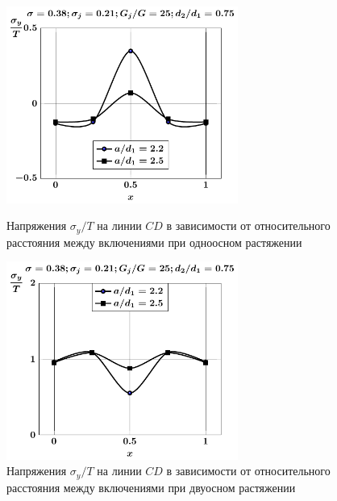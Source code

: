 \begin{figure}[h!]
\centering\footnotesize
\parbox[b]{7.5cm}{\centering\includegraphics[width=7.6cm]{inc13-a-d75-g25-t1-sig_y-cd.pdf}
\caption{Напряжения $\sigma_y/T$ на линии $CD$ в зависимости от относительного расстояния между включениями при одноосном растяжении
\label{f:9:83}}}\hfil\hfil
\parbox[b]{7.5cm}{\centering\includegraphics[width=7.6cm]{inc13-a-d75-g25-t2-sig_y-cd.pdf}
\caption{Напряжения $\sigma_y/T$ на линии $CD$ в зависимости от относительного расстояния между включениями при двуосном растяжении
\label{f:9:84}}}
\end{figure}

